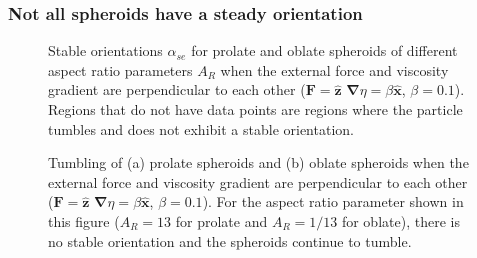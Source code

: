 \documentclass{jfm}
\begin{document}

\subsubsection{Not all spheroids have a steady orientation}

\begin{figure}
\centering
{}
\caption{Stable orientations $\alpha_{se}$ for prolate and oblate spheroids of different aspect ratio parameters $A_R$ when the external force and viscosity gradient are perpendicular to each other ($\boldsymbol{F} = \boldsymbol{\hat{z}}$ $\boldsymbol{\nabla}\eta = \beta \boldsymbol{\hat{x}}$, $\beta = 0.1$).  Regions that do not have data points are regions where the particle tumbles and does not exhibit a stable orientation.  }
\label{fig:Orient_Y_Stable_Prolate_AR}
\end{figure}

\begin{figure}
\centering
{}
\caption{Tumbling of (a) prolate spheroids and (b) oblate spheroids when the external force and viscosity gradient are perpendicular to each other ($\boldsymbol{F} = \boldsymbol{\hat{z}}$ $\boldsymbol{\nabla}\eta = \beta \boldsymbol{\hat{x}}$, $\beta = 0.1$). For the aspect ratio parameter shown in this figure ($A_R =13$ for prolate and $A_R =1/13$ for oblate), there is no stable orientation and the spheroids continue to tumble.}
\label{fig:Orient_Y_Unstable}
\end{figure}
\end{document}
